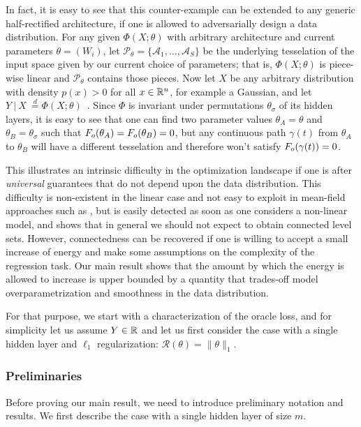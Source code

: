 In fact, it is easy to see that this counter-example can be extended to any generic half-rectified architecture, if one is 
allowed to adversarially design a data distribution. For any given $\Phi(X; \theta)$ with arbitrary architecture and current parameters 
$\theta = (W_i)$, let $\mathcal{P}_\theta=\{ \mathcal{A}_1, \dots, \mathcal{A}_S\}$ be the underlying tesselation of the input space given by our current choice of parameters; that is, $\Phi(X; \theta)$ is piece-wise linear and $\mathcal{P}_\theta$ contains those pieces. Now let 
$X$ be any arbitrary distribution with density $p(x) > 0$ for all $x \in {\mathbb{R}}^n$, for example a Gaussian, and let %
$Y ~|~X ~\stackrel{d}{=} \Phi(X ; \theta)$~. Since $\Phi$ is invariant under permutations $\theta_\sigma$ of its hidden layers, it is easy to see that one can find two parameter values $\theta_A = \theta$ and $\theta_B = \theta_\sigma$ such that $F_{o}(\theta_A) = F_{o}(\theta_B) = 0$, but any continuous path $\gamma(t)$ from $\theta_A$ to $\theta_B$ will have a different tesselation and therefore won't satisfy $F_{o}( \gamma(t) ) = 0$. 
 
This illustrates an intrinsic difficulty in the optimization landscape if one is after \emph{universal} 
guarantees that do not depend upon the data distribution. This difficulty is non-existent in the linear case 
and not easy to exploit in mean-field approaches such as \cite{choromaska}, but 
is easily detected as soon as one considers a non-linear model, and shows that in general 
we should not expect to obtain connected level sets. However, 
connectedness can be recovered if one is willing to accept a small increase 
of energy and make some assumptions on the complexity of the regression task.
 Our main result shows that the amount by which the energy is 
allowed to increase is upper bounded by a quantity that trades-off model overparametrization 
and smoothness in the data distribution.

For that purpose, we start with a characterization of the oracle loss, and for simplicity let us assume 
$Y \in {\mathbb{R}}$ and let us first consider the case with a single hidden layer and $\ell_1$ regularization:
$\mathcal{R}(\theta) = \| \theta\|_1$.

\subsubsection{Preliminaries}
 Before proving our main result, we need to introduce  preliminary notation and results. 
We first describe the case with a single hidden layer of size $m$. 

